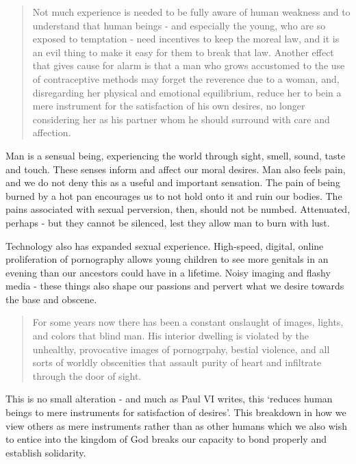 \documentclass[letterpaper]{article}
\begin{document}
\begin{quote}
  Not much experience is needed to be fully aware of human weakness and to understand that human beings - and especially the young, who are so exposed to temptation - need incentives to keep the moreal law, and it is an evil thing to make it easy for them to break that law. Another effect that gives cause for alarm is that a man who grows accustomed to the use of contraceptive methods may forget the reverence due to a woman, and, disregarding her physical and emotional equilibrium, reduce her to bein a mere instrument for the satisfaction of his own desires, no longer considering her as his partner whom he should surround with care and affection.
\end{quote}

Man is a sensual being, experiencing the world through sight, smell, sound, taste and touch. These senses inform and affect our moral desires. Man also feels pain, and we do not deny this as a useful and important sensation. The pain of being burned by a hot pan encourages us to not hold onto it and ruin our bodies. The pains associated with sexual perversion, then, should not be numbed. Attenuated, perhaps - but they cannot be silenced, lest they allow man to burn with lust.

Technology also has expanded sexual experience. High-speed, digital, online proliferation of pornography allows young children to see more genitals in an evening than our ancestors could have in a lifetime. Noisy imaging and flashy media - these things also shape our passions and pervert what we desire towards the base and obscene.

\begin{quote}
  For some years now there has been a constant onslaught of images, lights, and colors that blind man. His interior dwelling is violated by the unhealthy, provocative images of pornogrpahy, bestial violence, and all sorts of worldly obscenities that assault purity of heart and infiltrate through the door of sight.
\end{quote}

This is no small alteration - and much as Paul VI writes, this `reduces human beings to mere instruments for satisfaction of desires'. This breakdown in how we view others as mere instruments rather than as other humans which we also wish to entice into the kingdom of God breaks our capacity to bond properly and establish solidarity.
\end{document}
